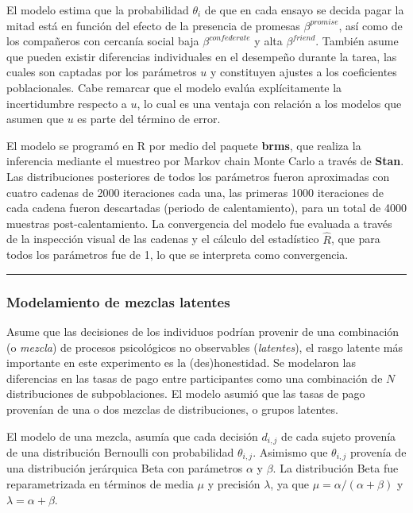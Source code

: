 \documentclass[]{article}
\begin{document}
El modelo estima que la probabilidad \(\theta_i\) de que en cada ensayo
se decida pagar la mitad está en función del efecto de la presencia de
promesas \(\beta^{promise}\), así como de los compañeros con cercanía
social baja \(\beta^{confederate}\) y alta \(\beta^{friend}\). También
asume que pueden existir diferencias individuales en el desempeño
durante la tarea, las cuales son captadas por los parámetros \(u\) y
constituyen ajustes a los coeficientes poblacionales. Cabe remarcar que
el modelo evalúa explícitamente la incertidumbre respecto a \(u\), lo
cual es una ventaja con relación a los modelos que asumen que \(u\) es
parte del término de error.

El modelo se programó en R por medio del paquete \textbf{brms}, que
realiza la inferencia mediante el muestreo por Markov chain Monte Carlo
a través de \textbf{Stan}. Las distribuciones posteriores de todos los
parámetros fueron aproximadas con cuatro cadenas de 2000 iteraciones
cada una, las primeras 1000 iteraciones de cada cadena fueron
descartadas (periodo de calentamiento), para un total de 4000 muestras
post-calentamiento. La convergencia del modelo fue evaluada a través de
la inspección visual de las cadenas y el cálculo del estadístico
\(\hat{R}\), que para todos los parámetros fue de 1, lo que se
interpreta como convergencia.

\begin{center}\rule{0.5\linewidth}{\linethickness}\end{center}

\subsubsection{Modelamiento de mezclas
latentes}\label{modelamiento-de-mezclas-latentes}

Asume que las decisiones de los individuos podrían provenir de una
combinación (o \emph{mezcla}) de procesos psicológicos no observables
(\emph{latentes}), el rasgo latente más importante en este experimento
es la (des)honestidad. Se modelaron las diferencias en las tasas de pago
entre participantes como una combinación de \(N\) distribuciones de
subpoblaciones. El modelo asumió que las tasas de pago provenían de una
o dos mezclas de distribuciones, o grupos latentes.

El modelo de una mezcla, asumía que cada decisión \(d_{i,j}\) de cada
sujeto provenía de una distribución Bernoulli con probabilidad
\(\theta_{i,j}\). Asimismo que \(\theta_{i,j}\) provenía de una
distribución jerárquica Beta con parámetros \(\alpha\) y \(\beta\). La
distribución Beta fue reparametrizada en términos de media \(\mu\) y
precisión \(\lambda\), ya que \(\mu = \alpha/(\alpha + \beta)\) y
\(\lambda = \alpha + \beta\).
\end{document}
